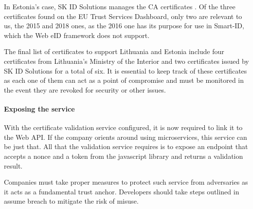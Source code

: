 In Estonia's case, SK ID Solutions manages the CA certificates \cite{eid-ee-skid-certificates}. Of the three certificates found on the EU Trust Services Dashboard, only two are relevant to us, the 2015 and 2018 ones, as the 2016 one has its purpose for use in Smart-ID, which the Web eID framework does not support.

The final list of certificates to support Lithuania and Estonia include four certificates from Lithuania's Ministry of the Interior and two certificates issued by SK ID Solutions for a total of six. It is essential to keep track of these certificates as each one of them can act as a point of compromise and must be monitored in the event they are revoked for security \cite{roca-vulnerability-lessons-learned} or other issues.

\paragraph{Exposing the service}

With the certificate validation service configured, it is now required to link it to the Web API. If the company orients around using microservices, this service can be just that. All that the validation service requires is to expose an endpoint that accepts a nonce and a token from the javascript library and returns a validation result.

Companies must take proper measures to protect such service from adversaries as it acts as a fundamental trust anchor. Developers should take steps outlined in assume breach  to mitigate the risk of misuse.


